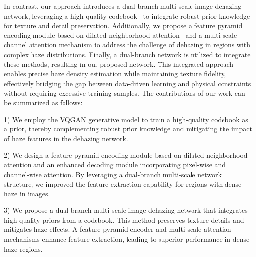 \documentclass[journal]{IEEEtran}
\begin{document}
In contrast, our approach introduces a dual-branch multi-scale image dehazing network, leveraging a high-quality codebook~\cite{esser2021taming} to integrate robust prior knowledge for texture and detail preservation. Additionally, we propose a feature pyramid encoding module based on dilated neighborhood attention~\cite{hassani2022dilated} and a multi-scale channel attention mechanism to address the challenge of dehazing in regions with complex haze distributions. Finally, a dual-branch network is utilized to integrate these methods, resulting in our proposed network. This integrated approach enables precise haze density estimation while maintaining texture fidelity, effectively bridging the gap between data-driven learning and physical constraints without requiring excessive training samples. The contributions of our work can be summarized as follows:

\begin{list}{}{}
	\item{1) We employ the VQGAN generative model to train a high-quality codebook as a prior, thereby complementing robust prior knowledge and mitigating the impact of haze features in the dehazing network.}

	\item{2) We design a feature pyramid encoding module based on dilated neighborhood attention and an enhanced decoding module incorporating pixel-wise and channel-wise attention. By leveraging a dual-branch multi-scale network structure, we improved the feature extraction capability for regions with dense haze in images.}

	\item{3) We propose a dual-branch multi-scale image dehazing network that integrates high-quality priors from a codebook. This method preserves texture details and mitigates haze effects. A feature pyramid encoder and multi-scale attention mechanisms enhance feature extraction, leading to superior performance in dense haze regions.}
\end{list}
\end{document}
